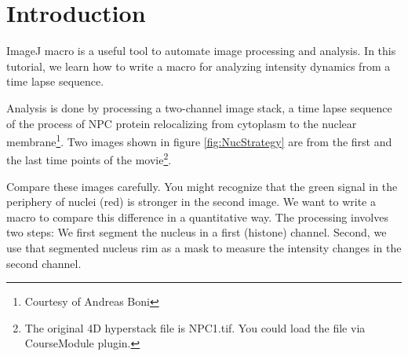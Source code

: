 \section{Introduction}

ImageJ macro is a useful tool to automate image processing and analysis. In this tutorial, we learn how to write a macro for analyzing intensity dynamics from a time lapse sequence.

Analysis is done by processing a two-channel image stack, a time lapse sequence of the process of NPC protein relocalizing from cytoplasm to the nuclear membrane\footnote{Courtesy of Andreas Boni}. Two images shown in figure \ref{fig:NucStrategy}  are from the first and the last time points of the movie\footnote{The original 4D hyperstack file is NPC1.tif. You could load the file via CourseModule plugin.}.

Compare these images carefully. You might recognize that the green signal in the periphery of nuclei (red) is stronger in the second image. We want to write a macro to compare this difference in a quantitative way. The processing involves two steps: We first segment the nucleus in a first (histone) channel. Second, we use that segmented nucleus rim as a mask to measure the intensity changes in the second channel.